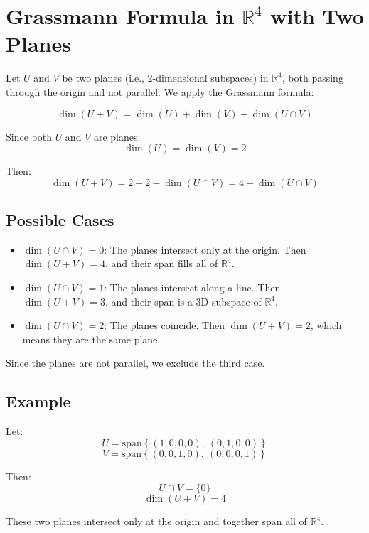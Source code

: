 \documentclass{article}
\begin{document}
	
	\section*{Grassmann Formula in \(\mathbb{R}^4\) with Two Planes}
	
	Let \( U \) and \( V \) be two planes (i.e., 2-dimensional subspaces) in \( \mathbb{R}^4 \), both passing through the origin and not parallel. We apply the Grassmann formula:
	
	\[
	\dim(U + V) = \dim(U) + \dim(V) - \dim(U \cap V)
	\]
	
	Since both \( U \) and \( V \) are planes:
	\[
	\dim(U) = \dim(V) = 2
	\]
	
	Then:
	\[
	\dim(U + V) = 2 + 2 - \dim(U \cap V) = 4 - \dim(U \cap V)
	\]
	
	\subsection*{Possible Cases}
	
	\begin{itemize}
		\item \(\dim(U \cap V) = 0\): The planes intersect only at the origin. Then \(\dim(U + V) = 4\), and their span fills all of \(\mathbb{R}^4\).
		\item \(\dim(U \cap V) = 1\): The planes intersect along a line. Then \(\dim(U + V) = 3\), and their span is a 3D subspace of \(\mathbb{R}^4\).
		\item \(\dim(U \cap V) = 2\): The planes coincide. Then \(\dim(U + V) = 2\), which means they are the same plane.
	\end{itemize}
	
	Since the planes are not parallel, we exclude the third case.
	
	\subsection*{Example}
	
	Let:
	\[
	U = \text{span}\left\{ (1, 0, 0, 0),\ (0, 1, 0, 0) \right\}
	\]
	\[
	V = \text{span}\left\{ (0, 0, 1, 0),\ (0, 0, 0, 1) \right\}
	\]
	
	Then:
	\[
	U \cap V = \{0\}
	\]
	\[
	\dim(U + V) = 4
	\]
	
	These two planes intersect only at the origin and together span all of \(\mathbb{R}^4\).
	
\end{document}
